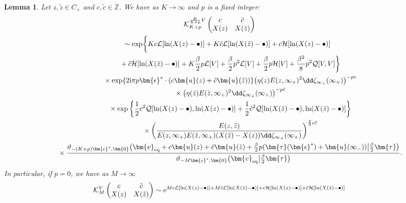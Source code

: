 \documentclass[pdftex]{sigma}
\numberwithin{equation}{section}
\newtheorem{Lemma}[Theorem]{Lemma}
\begin{document}
\begin{Lemma}\label{Kasymint}\allowdisplaybreaks Let $z,\tilde{z} \in C_+$ and $c,\tilde{c} \in \mathbb{Z}$. We have as $K \rightarrow \infty$ and $p$ is a fixed integer:
\begin{gather*}
	  \mathcal{K}^{\frac{K}{K + p}V}_{K + p}\left(\begin{matrix}
										 c & \tilde{c} \\
										 X(z) & X(\tilde{z})
									 \end{matrix}\right) \\
	\qquad{} \sim\exp\biggl\{Kc \mathcal{L}[\ln(X(z) - \bullet)] + K\tilde{c}\mathcal{L}[\ln(X(\tilde{z}) - \bullet)] + c\mathcal{H}[\ln(X(z) - \bullet)]\\
\qquad\quad{} + \tilde{c}\mathcal{H}[\ln(X(\tilde{z}) - \bullet)] + K\frac{\beta}{2}p\mathcal{L}[V] + \frac{\beta}{2}p^2 \mathcal{L}[V] + \frac{\beta}{2}p\mathcal{H}[V] + \frac{\beta^2}{8}p^2 \mathcal{Q}[V,V]\biggr\} \\
\qquad\quad{} \times \exp\{2{\rm i}\pi p \bm{\epsilon}^* \cdot (c \bm{u}(z) + \tilde{c} \bm{u}(\tilde{z}))\} \bigl(\eta(z)E(z,\infty_+)^{2}\dd \zeta_{\infty_+}(\infty_+)\bigr)^{-pc} \\
\qquad\quad{} \times
\bigl(\eta( \tilde{z})E(\tilde{z},\infty_+)^{2}\dd \zeta_{\infty_+}(\infty_+)\bigr)^{-p\tilde{c}} \\
\qquad\quad{} \times\exp\left\{\frac{1}{2}c^2 \mathcal{Q}[\ln(X(z) - \bullet),\ln(X(z) - \bullet)] + \frac{1}{2} \tilde{c}^2 \mathcal{Q}[\ln(X(\tilde{z}) - \bullet),\ln(X(\tilde{z}) - \bullet)]\right\} \\
\qquad\quad{} \times\left(\frac{E(z,\tilde{z})}{E(z,\infty_+)E(\tilde{z},\infty_+)(X(\tilde{z}) - X(z))\dd \zeta_{\infty_+}(\infty_+)}\right)^{\frac{2}{\beta}c\tilde{c}} \\
\qquad\quad{}
 \times \frac{\vartheta_{-(K + p)\bm{\epsilon}^*,\bm{0}}\bigl(\bm{v}_{{\rm eq}} + c\bm{u}(z) + \tilde{c}\bm{u}(\tilde{z}) + \frac{\beta}{2} p(\bm{\tau}(\bm{\epsilon}^{*}) + \bm{u}(\infty_-)) \big| \frac{\beta}{2} \bm{\tau}\bigr)}{\vartheta_{-M\bm{\epsilon}^{*},\bm{0}}\bigl(\bm{v}_{{\rm eq}}\big|\frac{\beta}{2}\bm{\tau}\bigr)}.
\end{gather*}
In particular, if $p = 0$, we have as $M \rightarrow \infty$
\begin{align*}
	\mathcal{K}^{V}_{M}\left(\begin{matrix} c & \tilde{c} \\ X(z) & X(\tilde{z}) \end{matrix}\right) &{}\sim{\rm e}^{Mc \mathcal{L}[\ln(X(z) - \bullet)] + M\tilde{c}\mathcal{L}[\ln(X(\tilde{z}) - \bullet)] + c\mathcal{H}[\ln(X(z) - \bullet)] + \tilde{c}\mathcal{H}[\ln(X(\tilde{z}) - \bullet)]} \\

\end{align*}
\end{Lemma}
\end{document}
